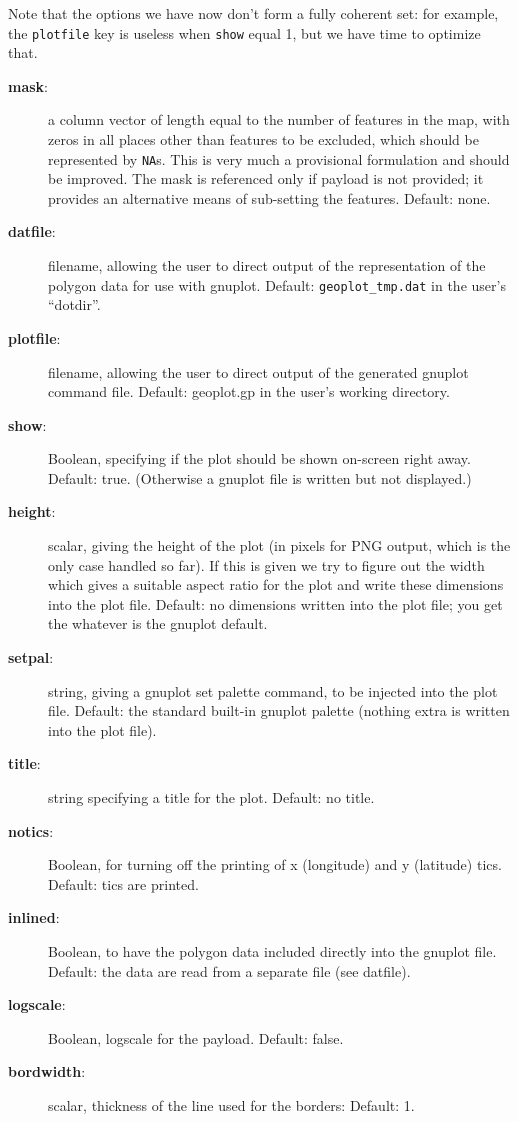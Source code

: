 \documentclass{article}
\begin{document}
Note that the options we have now don't form a fully coherent set: for
example, the \texttt{plotfile} key is useless when \texttt{show} equal
1, but we have time to optimize that.
\begin{description}
\item[\textbf{mask}:] a column vector of length equal to the number of
  features in the map, with zeros in all places other than features to
  be excluded, which should be represented by \texttt{NA}s. This is
  very much a provisional formulation and should be improved. The mask
  is referenced only if payload is not provided; it provides an
  alternative means of sub-setting the features. Default: none.
\item[\textbf{datfile}:] filename, allowing the user to direct
  output of the representation of the polygon data for use with
  gnuplot. Default: \texttt{geoplot\_tmp.dat} in the user’s “dotdir”.
\item[\textbf{plotfile}:] filename, allowing the user to direct output
  of the generated gnuplot command file. Default: geoplot.gp in the
  user’s working directory.
\item[\textbf{show}:] Boolean, specifying if the plot should be shown
  on-screen right away. Default: true. (Otherwise a gnuplot file is
  written but not displayed.)
\item[\textbf{height}:] scalar, giving the height of the plot (in
  pixels for PNG output, which is the only case handled so far). If
  this is given we try to figure out the width which gives a suitable
  aspect ratio for the plot and write these dimensions into the plot
  file. Default: no dimensions written into the plot file; you get the
  whatever is the gnuplot default.
\item[\textbf{setpal}:] string, giving a gnuplot set palette command,
  to be injected into the plot file.  Default: the standard built-in
  gnuplot palette (nothing extra is written into the plot file).
\item[\textbf{title}:] string specifying a title for the
  plot. Default: no title.
\item[\textbf{notics}:] Boolean, for turning off the printing of x
  (longitude) and y (latitude) tics. Default: tics are printed.
\item[\textbf{inlined}:] Boolean, to have the polygon data included
  directly into the gnuplot file. Default: the data are read from a
  separate file (see datfile).
\item[\textbf{logscale}:] Boolean, logscale for the payload. Default: false.
\item[\textbf{bordwidth}:] scalar, thickness of the line used for the
  borders: Default: 1.
\end{description}
\end{document}
